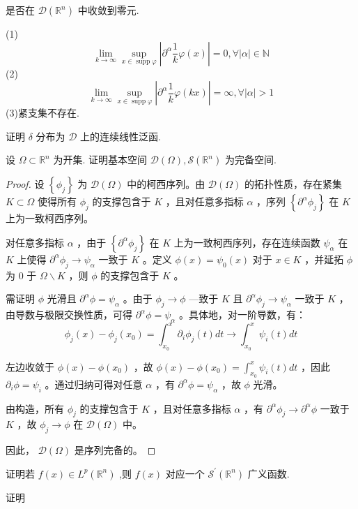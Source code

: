 \documentclass[lang=cn,newtx,10pt,scheme=chinese,thmcnt=chapter]{elegantbook}
\begin{document}
\begin{problemset}
是否在 \(\mathcal{D}\left( {\mathbb{R}}^{n}\right)\) 中收敛到零元.
\begin{solution}
(1)
\[    \lim_{k\to \infty}\sup\limits_{x\in \operatorname{supp}\varphi}|\partial^\alpha \frac{1}{k}\varphi(x)|=0,\forall |\alpha|\in \mathbb{N}\]
(2)
\[    \lim_{k\to \infty}\sup\limits_{x\in \operatorname{supp}\varphi}|\partial^\alpha \frac{1}{k}\varphi(kx)|=\infty,\forall |\alpha|>1\]
(3)紧支集不存在.
\end{solution}
\item 证明 \(\delta\) 分布为 \(\mathcal{D}\) 上的连续线性泛函.
\item 设 \(\Omega  \subset  {\mathbb{R}}^{n}\) 为开集. 证明基本空间 \(\mathcal{D}\left( \Omega \right) ,\mathcal{S}\left( {\mathbb{R}}^{n}\right)\) 为完备空间.
\begin{proof}
设 $\left\{\phi_j\right\}$ 为 $\mathcal{D}(\Omega)$ 中的柯西序列。由 $\mathcal{D}(\Omega)$ 的拓扑性质，存在紧集 $K \subset \Omega$ 使得所有 $\phi_j$ 的支撑包含于 $K$ ，且对任意多指标 $\alpha$ ，序列 $\left\{\partial^\alpha \phi_j\right\}$ 在 $K$ 上为一致柯西序列。

对任意多指标 $\alpha$ ，由于 $\left\{\partial^\alpha \phi_j\right\}$ 在 $K$ 上为一致柯西序列，存在连续函数 $\psi_\alpha$ 在 $K$ 上使得 $\partial^\alpha \phi_j \rightarrow \psi_\alpha$ 一致于 $K$ 。定义 $\phi(x)=\psi_0(x)$ 对于 $x \in K$ ，并延拓 $\phi$ 为 0 于 $\Omega \backslash K$ ，则 $\phi$ 的支撑包含于 $K$ 。

需证明 $\phi$ 光滑且 $\partial^\alpha \phi=\psi_\alpha$ 。由于 $\phi_j \rightarrow \phi$ —致于 $K$ 且 $\partial^\alpha \phi_j \rightarrow \psi_\alpha$ 一致于 $K$ ，由导数与极限交换性质，可得 $\partial^\alpha \phi=\psi_\alpha$ 。具体地，对一阶导数，有：
$$
\phi_j(x)-\phi_j\left(x_0\right)=\int_{x_0}^x \partial_i \phi_j(t) d t \rightarrow \int_{x_0}^x \psi_i(t) d t
$$

左边收敛于 $\phi(x)-\phi\left(x_0\right)$ ，故 $\phi(x)-\phi\left(x_0\right)=\int_{x_0}^x \psi_i(t) d t$ ，因此 $\partial_i \phi=\psi_i$ 。通过归纳可得对任意 $\alpha$ ，有 $\partial^\alpha \phi=\psi_\alpha$ ，故 $\phi$ 光滑。

由构造，所有 $\phi_j$ 的支撑包含于 $K$ ，且对任意多指标 $\alpha$ ，有 $\partial^\alpha \phi_j \rightarrow \partial^\alpha \phi$ 一致于 $K$ ，故 $\phi_j \rightarrow \phi$ 在 $\mathcal{D}(\Omega)$ 中。

因此， $\mathcal{D}(\Omega)$ 是序列完备的。


\end{proof}
\item 证明若 \(f\left( x\right)  \in  {L}^{p}\left( {\mathbb{R}}^{n}\right)\) ,则 \(f\left( x\right)\) 对应一个 \({\mathcal{S}}^{\prime }\left( {\mathbb{R}}^{n}\right)\) 广义函数.
\item 证明


\end{problemset}
\end{document}
